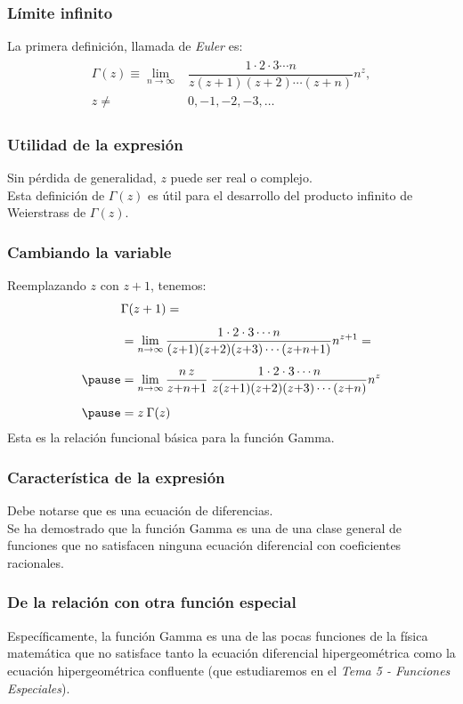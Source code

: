 \documentclass[12pt]{beamer}
\begin{document}
\begin{frame}
\frametitle{Límite infinito}
La primera definición, llamada de \emph{Euler} es:
\pause
\begin{eqnarray}
\begin{aligned}
\Gamma(z) \equiv \lim_{n \to \infty} &\dfrac{1 \cdot 2 \cdot 3 \cdots n}{z (z + 1) (z + 2) \cdots (z + n)} n^{z}, \\ 
z \neq &0, -1,-2,-3, \ldots
\label{eq:ecuacion_10_01}
\end{aligned}
\end{eqnarray}
\end{frame}
\begin{frame}
\frametitle{Utilidad de la expresión}
Sin pérdida de generalidad, $z$ puede ser real o complejo.
\\
\bigskip
\pause
Esta definición de $\Gamma(z)$ es útil para el desarrollo del producto infinito de Weierstrass de $\Gamma (z)$.
\end{frame}
\begin{frame}
\frametitle{Cambiando la variable}
Reemplazando $z$ con $z + 1$, tenemos:
\pause
\begin{eqnarray}
\begin{aligned}[b]
&\Gamma (z + 1) = \\[0.5em]
&= \lim_{n \to \infty} \dfrac{1 \cdot 2 \cdot 3 \cdots n}{(z {+} 1)(z {+} 2)(z {+} 3) \cdots (z {+} n {+} 1)} n^{z {+} 1} = \\[0.5em] \pause
&= \lim_{n \to \infty} \dfrac{n \, z}{z {+} n {+} 1} \: \dfrac{1 \cdot 2 \cdot 3 \cdots n}{z (z {+} 1)(z {+} 2)(z {+} 3) \cdots (z {+} n)} n^{z} \\[0.5em] \pause
&= z \: \Gamma (z)
\label{eq:ecuacion_10_02}
\end{aligned}
\end{eqnarray}
\fontsize{12}{12}\selectfont
Esta es la relación funcional básica para la función Gamma.
\end{frame}
\begin{frame}
\frametitle{Característica de la expresión}
Debe notarse que es una ecuación de diferencias.
\\
\bigskip
\pause
Se ha demostrado que la función Gamma es una de una clase general de funciones que no satisfacen ninguna ecuación diferencial con coeficientes racionales.
\end{frame}
\begin{frame}
\frametitle{De la relación con otra función especial}
Específicamente, la función Gamma es una de las pocas funciones de la física matemática que no satisface tanto la ecuación diferencial hipergeométrica como la ecuación hipergeométrica confluente (que estudiaremos en el \emph{Tema 5 - Funciones Especiales}).
\end{frame}
\end{document}
